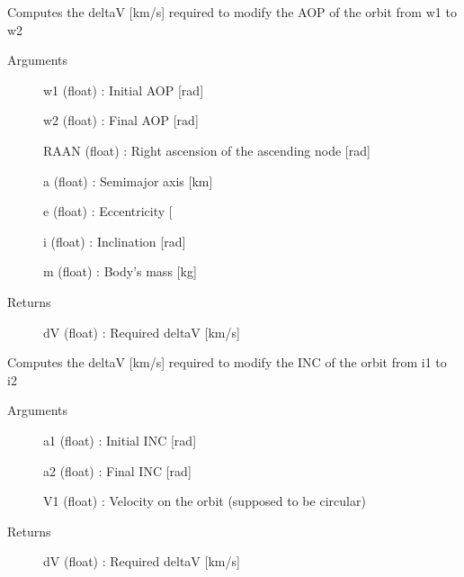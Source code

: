 \documentclass[letterpaper,10pt,english]{sphinxmanual}
\begin{document}
\begin{fulllineitems}
\label{\detokenize{regroupement/dV_computations:id0}}
Computes the delta\sphinxhyphen{}V {[}km/s{]} required to modify the AOP of the orbit from w1 to w2
\begin{description}
\item[{Arguments}] \leavevmode{[}{]}
w1 (float) : Initial AOP {[}rad{]}

w2 (float) : Final AOP {[}rad{]}

RAAN (float) : Right ascension of the ascending node {[}rad{]}

a (float) : Semi\sphinxhyphen{}major axis {[}km{]}

e (float) : Eccentricity {[}\sphinxhyphen{}{]}

i (float) : Inclination {[}rad{]}

m (float) : Body’s mass {[}kg{]}

\item[{Returns}] \leavevmode{[}{]}
dV (float) : Required delta\sphinxhyphen{}V {[}km/s{]}

\end{description}

\end{fulllineitems}


\begin{fulllineitems}
\label{\detokenize{regroupement/dV_computations:id1}}
Computes the delta\sphinxhyphen{}V {[}km/s{]} required to modify the INC of the orbit from i1 to i2
\begin{description}
\item[{Arguments}] \leavevmode{[}{]}
a1 (float) : Initial INC {[}rad{]}

a2 (float) : Final INC {[}rad{]}

V1 (float) : Velocity on the orbit (supposed to be circular)

\item[{Returns}] \leavevmode{[}{]}
dV (float) : Required delta\sphinxhyphen{}V {[}km/s{]}

\end{description}

\end{fulllineitems}
\end{document}
